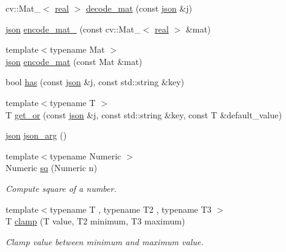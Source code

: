 \begin{DoxyCompactItemize}
\item 
cv\+::\+Mat\+\_\+$<$ \hyperlink{namespacetlz_a15fd37cce97f2b8b606af18c2615f602}{real} $>$ \hyperlink{namespacetlz_a066563a26e2de02f215b179f3d3a53da}{decode\+\_\+mat} (const \hyperlink{namespacetlz_ac400657dfcddf6309a769aefc23eed0c}{json} \&j)
\item 
\hyperlink{namespacetlz_ac400657dfcddf6309a769aefc23eed0c}{json} \hyperlink{namespacetlz_a7b27ca69fad329b4a00aceee41d2962b}{encode\+\_\+mat\+\_\+} (const cv\+::\+Mat\+\_\+$<$ \hyperlink{namespacetlz_a15fd37cce97f2b8b606af18c2615f602}{real} $>$ \&mat)
\item 
{\footnotesize template$<$typename Mat $>$ }\\\hyperlink{namespacetlz_ac400657dfcddf6309a769aefc23eed0c}{json} \hyperlink{namespacetlz_acf7ca4ee1b750cf31a40170bea887d46}{encode\+\_\+mat} (const Mat \&mat)
\item 
bool \hyperlink{namespacetlz_a252af14b9b4ac6502d3e9c5dd8dc90b8}{has} (const \hyperlink{namespacetlz_ac400657dfcddf6309a769aefc23eed0c}{json} \&j, const std\+::string \&key)
\item 
{\footnotesize template$<$typename T $>$ }\\T \hyperlink{namespacetlz_add846dc50c32dfb356cb1a7ac11d37ac}{get\+\_\+or} (const \hyperlink{namespacetlz_ac400657dfcddf6309a769aefc23eed0c}{json} \&j, const std\+::string \&key, const T \&default\+\_\+value)
\item 
\hyperlink{namespacetlz_ac400657dfcddf6309a769aefc23eed0c}{json} \hyperlink{namespacetlz_a35f9e03fa4fd9cec699f5fa27962400f}{json\+\_\+arg} ()
\item 
{\footnotesize template$<$typename Numeric $>$ }\\Numeric \hyperlink{namespacetlz_a318f0ec11ecbe39c32ad870473ea9c35}{sq} (Numeric n)
\begin{DoxyCompactList}\small\item\em Compute square of a number. \end{DoxyCompactList}\item 
{\footnotesize template$<$typename T , typename T2 , typename T3 $>$ }\\T \hyperlink{namespacetlz_a643b2d03bd805fe78dcd684ef45e52fb}{clamp} (T value, T2 minimum, T3 maximum)
\begin{DoxyCompactList}\small\item\em Clamp {\ttfamily value} between {\ttfamily minimum} and {\ttfamily maximum} value. \end{DoxyCompactList}\item 

\end{DoxyCompactItemize}
